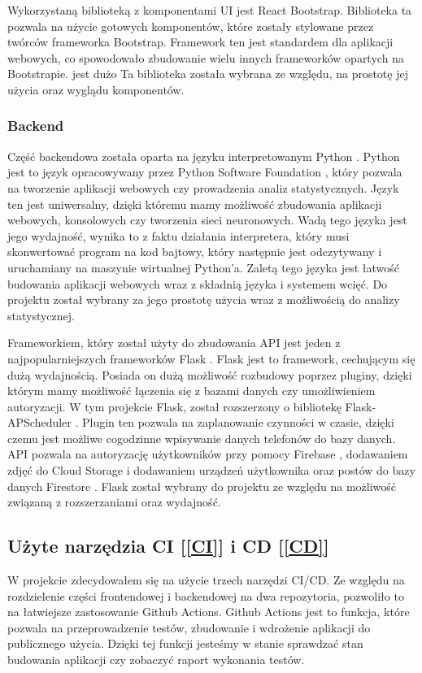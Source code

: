 Wykorzystaną biblioteką z komponentami UI jest React Bootstrap. Biblioteka ta pozwala na użycie gotowych komponentów, które zostały stylowane przez twórców frameworka Bootstrap. Framework ten jest standardem dla aplikacji webowych, co spowodowało zbudowanie wielu innych frameworków opartych na Bootstrapie. jest dużo Ta biblioteka została wybrana ze względu, na prostotę jej użycia oraz wyglądu komponentów. 

\subsubsection{Backend}
Część backendowa została oparta na języku interpretowanym Python \cite{python}. Python jest to język opracowywany przez Python Software Foundation \cite{psf}, który pozwala na tworzenie aplikacji webowych czy prowadzenia analiz statystycznych. Język ten jest uniwersalny, dzięki któremu mamy możliwość zbudowania aplikacji webowych, konsolowych czy tworzenia sieci neuronowych. Wadą tego języka jest jego wydajność, wynika to z faktu działania interpretera, który musi skonwertować program na kod bajtowy, który następnie jest odczytywany i uruchamiany na maszynie wirtualnej Python'a. Zaletą tego języka jest łatwość budowania aplikacji webowych wraz z składnią języka i systemem wcięć. Do projektu został wybrany za jego prostotę użycia wraz z możliwością do analizy statystycznej.

Frameworkiem, który został użyty do zbudowania API jest jeden z najpopularniejszych frameworków Flask \cite{flask}. Flask jest to framework, cechującym się dużą wydajnością. Posiada on dużą możliwość rozbudowy poprzez pluginy, dzięki którym mamy możliwość łączenia się z bazami danych czy umożliwieniem autoryzacji. W tym projekcie Flask, został rozszerzony o bibliotekę Flask-APScheduler \cite{flask_apscheduler}. Plugin ten pozwala na zaplanowanie czynności w czasie, dzięki czemu jest możliwe cogodzinne wpisywanie danych telefonów do bazy danych. API pozwala na autoryzację użytkowników przy pomocy Firebase \cite{firebase}, dodawaniem zdjęć do Cloud Storage \cite{cloud_storage} i dodawaniem urządzeń użytkownika oraz postów do bazy danych Firestore \cite{firestore}. Flask został wybrany do projektu ze względu na możliwość związaną z rozszerzaniami oraz wydajność.

\subsection{Użyte narzędzia CI [\ref{CI}] i CD [\ref{CD}]}
W projekcie zdecydowałem się na użycie trzech narzędzi CI/CD. Ze względu na rozdzielenie części frontendowej i backendowej na dwa repozytoria, pozwoliło to na łatwiejsze zastosowanie Github Actions. Github Actions \cite{github_actions} jest to funkcja, które pozwala na przeprowadzenie testów, zbudowanie i wdrożenie aplikacji do publicznego użycia. Dzięki tej funkcji jesteśmy w stanie sprawdzać stan budowania aplikacji czy zobaczyć raport wykonania testów.

